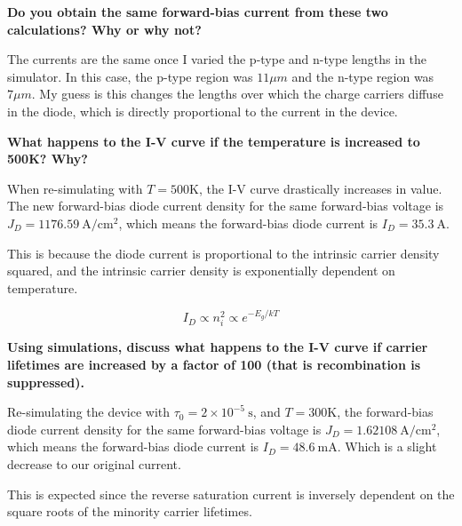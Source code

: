 \documentclass{IEEEtran}
\begin{document}
\textbf{Do you obtain the same forward-bias current from these two calculations? Why or why not?}

The currents are the same once I varied the p-type and n-type lengths in the simulator. In this case, the p-type region was \(11 \mu m\) and the n-type region was \(7 \mu m\). My guess is this changes the lengths over which the charge carriers diffuse in the diode, which is directly proportional to the current in the device.

\textbf{What happens to the I-V curve if the temperature is increased to 500K? Why?}

When re-simulating with \(T = 500\text{K}\), the I-V curve drastically increases in value. The new forward-bias diode current density for the same forward-bias voltage is \(J_D = 1176.59 ~ \text{A}/\text{cm}^2 \), which means the forward-bias diode current is \(I_D = 35.3 ~\text{A}\).

This is because the diode current is proportional to the intrinsic carrier density squared, and the intrinsic carrier density is exponentially dependent on temperature.

\begin{equation*}
    I_D \propto n_i^2 \propto e^{-E_g / kT}
\end{equation*}

\textbf{Using simulations, discuss what happens to the I-V curve if carrier lifetimes are increased by a factor of 100 (that is recombination is suppressed). }

Re-simulating the device with \(\tau_0 = 2 \times 10^{-5} ~\text{s}\), and \(T = 300\text{K}\), the forward-bias diode current density for the same forward-bias voltage is \(J_D = 1.62108 ~ \text{A}/\text{cm}^2 \), which means the forward-bias diode current is \(I_D = 48.6 ~\text{mA}\). Which is a slight decrease to our original current.

This is expected since the reverse saturation current is inversely dependent on the square roots of the minority carrier lifetimes. 



\end{document}

